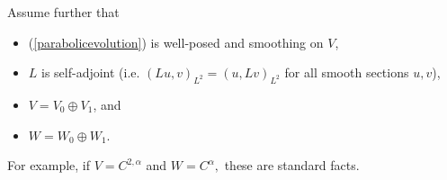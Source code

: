 \documentclass[12pt]{amsart}
\renewcommand{\1}{{\mathbf 1}}
\theoremstyle{others}
\numberwithin{equation}{section}
\begin{document}
Assume further that
\begin{itemize}
\item (\ref{parabolicevolution}) is well-posed and smoothing on $V$, 



\item $L$ is self-adjoint (i.e. $\left( L u , v \right)_{L^2} = \left( u , Lv \right)_{L^2}$ for all smooth sections $u,v$),


\item %
$V = V_0 \oplus V_1$, and

\item %
$W = W_0 \oplus W_1.$
\end{itemize}
For example, if $V = C^{2,\alpha}$ and $W = C^\alpha,$ these are standard facts. %

\end{document}
